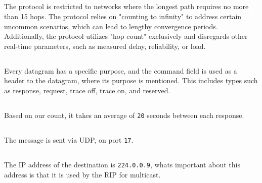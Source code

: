 \subsection{}
The protocol is restricted to networks where the longest path requires no more than 15 hops.
The protocol relies on "counting to infinity" to address certain uncommon scenarios,
which can lead to lengthy convergence periods. Additionally, the protocol utilizes "hop count" exclusively and disregards other real-time parameters,
such as measured delay, reliability, or load.
\subsection{}
Every datagram has a specific purpose, and the command field is used as a header to the datagram,
where its purpose is mentioned. This includes types such as response, 
request, trace off, trace on, and reserved.
\subsection{}
Based on our count, it takes an average of \texttt{20} seconds between each response.
\subsection{}
The message is sent via UDP, on port \texttt{17}.
\subsection{}
The IP address of the destination is \texttt{224.0.0.9}, whats important about this 
address is that it is used by the RIP for multicast.
